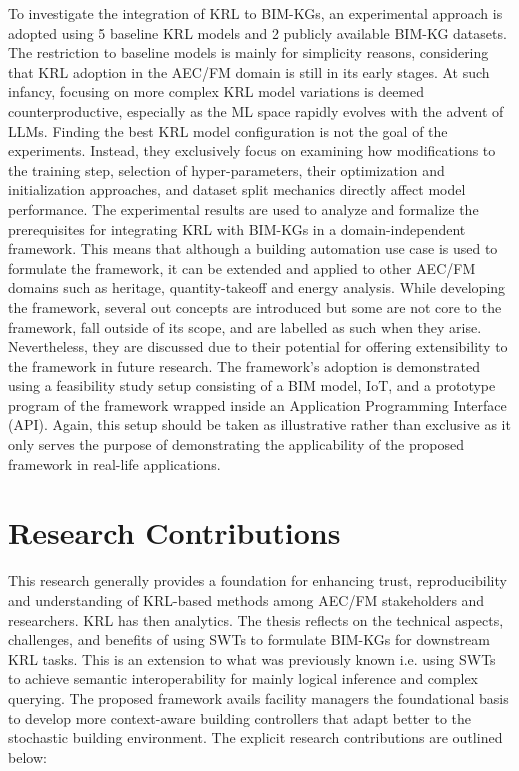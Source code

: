 To investigate the integration of \ac{KRL} to \acp{BIM-KG}, an experimental approach is adopted using 5 baseline \ac{KRL} models and 2 publicly available \ac{BIM-KG} datasets. The restriction to baseline models is mainly for simplicity reasons, considering that \ac{KRL} adoption in the \ac{AEC/FM} domain is still in its early stages. At such infancy, focusing on more complex \ac{KRL} model variations is deemed counterproductive, especially as the \ac{ML} space rapidly evolves with the advent of \acp{LLM}. Finding the best \ac{KRL} model configuration is not the goal of the experiments. Instead, they exclusively focus on examining how modifications to the training step, selection of hyper-parameters, their optimization and initialization approaches, and dataset split mechanics directly affect model performance. The experimental results are used to analyze and formalize the prerequisites for integrating \ac{KRL} with \acp{BIM-KG} in a domain-independent framework. This means that
although a building automation use case is used to formulate the framework, it can be extended and applied to other \ac{AEC/FM} domains such as heritage, quantity-takeoff and energy analysis. While developing the framework, several out concepts are introduced but some are not core to the framework, fall outside of its scope, and are labelled as such when they arise. Nevertheless, they are discussed due to their potential for offering extensibility to the framework in future research. The framework's adoption is demonstrated using a feasibility study setup consisting of a \ac{BIM} model, \ac{IoT}, and a prototype program of the framework wrapped inside an Application Programming Interface (API). Again, this setup should be taken as illustrative rather than exclusive as it only serves the purpose of demonstrating the applicability of the proposed framework in real-life applications.

\section{Research Contributions}
This research generally provides a foundation for enhancing trust, reproducibility and understanding of \ac{KRL}-based methods
among AEC/FM stakeholders and researchers. \ac{KRL} has then analytics. The thesis reflects on the technical aspects, challenges, and benefits of using \acp{SWT} to formulate \acp{BIM-KG} for downstream \ac{KRL} tasks. This is an extension to what was previously known i.e. using \acp{SWT} to achieve semantic interoperability for mainly logical inference and complex querying. The proposed framework avails facility managers the foundational basis to develop more context-aware building controllers that adapt better to the stochastic building environment. The explicit research contributions are outlined below:\\

